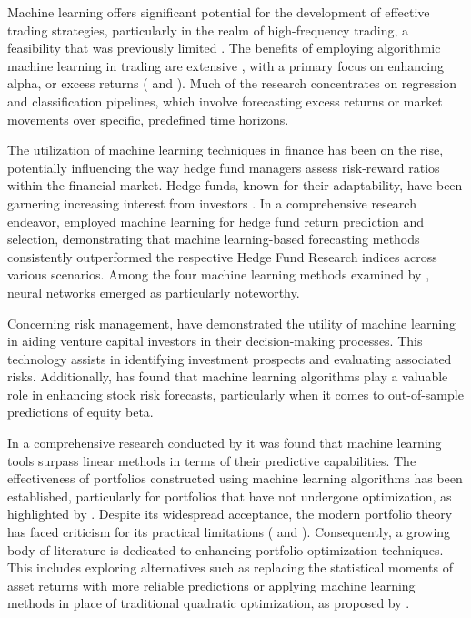  Machine learning offers significant potential for the development of effective trading strategies, particularly in the realm of high-frequency trading, a feasibility that was previously limited \citep{Arnott201964}. The benefits of employing algorithmic machine learning in trading are extensive \citep{Zhang202025}, with a primary focus on enhancing alpha, or excess returns (\citep{Sirignano20191449} and \citep{Zhang20193001}). Much of the research concentrates on regression and classification pipelines, which involve forecasting excess returns or market movements over specific, predefined time horizons.

The utilization of machine learning techniques in finance has been on the rise, potentially influencing the way hedge fund managers assess risk-reward ratios within the financial market. Hedge funds, known for their adaptability, have been garnering increasing interest from investors \citep{Wu20218119}. In a comprehensive research endeavor, \citep{Wu20218119} employed machine learning for hedge fund return prediction and selection, demonstrating that machine learning-based forecasting methods consistently outperformed the respective Hedge Fund Research indices across various scenarios. Among the four machine learning methods examined by \citep{Wu20218119}, neural networks emerged as particularly noteworthy.

Concerning risk management, \citep{Arroyo2019124233} have demonstrated the utility of machine learning in aiding venture capital investors in their decision-making processes. This technology assists in identifying investment prospects and evaluating associated risks. Additionally, \citep{Jurczenko2020} has found that machine learning algorithms play a valuable role in enhancing stock risk forecasts, particularly when it comes to out-of-sample predictions of equity beta.

In a comprehensive research conducted by \citep{Gu20202223} it was found that machine learning tools surpass linear methods in terms of their predictive capabilities. The effectiveness of portfolios constructed using machine learning algorithms has been established, particularly for portfolios that have not undergone optimization, as highlighted by \citep{Kaczmarek20211}. Despite its widespread acceptance, the modern portfolio theory has faced criticism for its practical limitations (\citep{Kolm2014356} and \citep{DeMiguel20091915}). Consequently, a growing body of literature is dedicated to enhancing portfolio optimization techniques. This includes exploring alternatives such as replacing the statistical moments of asset returns with more reliable predictions \citep{DeMiguel20091915} or applying machine learning methods in place of traditional quadratic optimization, as proposed by \citep{DePrado201659}.

